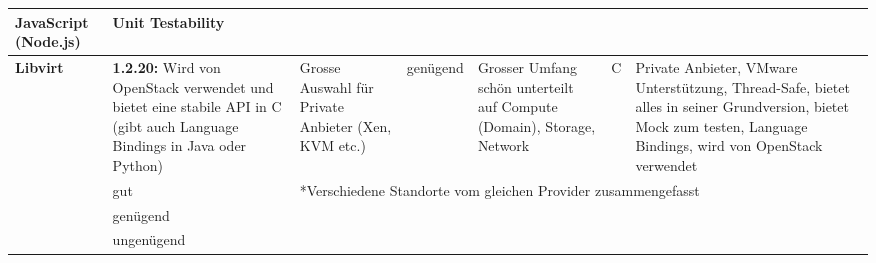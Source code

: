 \begin{landscape}
\begin{table}[h]
\begin{tabularx}{\linewidth}{|l|X|X|l|X|l|X|}
JavaScript (Node.js)
&
 \cellcolor{yellow!25}	
Unit Testability
\\
\hline
\textbf{Libvirt}	
&
\cellcolor{green!25}
\textbf{1.2.20:} Wird von OpenStack verwendet und bietet eine stabile API in C 
(gibt auch Language Bindings in Java oder Python)
&
\cellcolor{green!25}
Grosse Auswahl für Private Anbieter (Xen, KVM etc.)
&
 \cellcolor{yellow!25}	
genügend
&
\cellcolor{green!25}
Grosser Umfang schön unterteilt auf Compute (Domain), Storage, Network
&
\cellcolor{green!25}
C
&
\cellcolor{green!25}
Private Anbieter, VMware Unterstützung, Thread-Safe, bietet alles in seiner Grundversion, 
bietet Mock zum testen, Language Bindings, wird von OpenStack verwendet
\\
\hline
\cellcolor{green!25}
& 
gut
&
\multicolumn{5}{l|}{*Verschiedene Standorte vom gleichen Provider zusammengefasst}
\\
 \cellcolor{yellow!25}	
 &
 \multicolumn{6}{l}{genügend}
 \\
 \cellcolor{red!50}
 &
 \multicolumn{6}{l}{ungenügend}
 \\
   
  \end{tabularx}
  \end{table}
\end{landscape}
\restoregeometry
